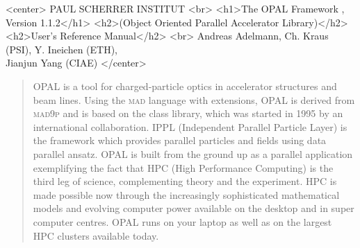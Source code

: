 \documentclass[12pt,a4paper]{report}
\newcommand{\opalversion}{\text{1.1.2 }}
\newcommand{\mad}{\textsc{mad }}
\newcommand{\madninep}{\textsc{mad9p }}
\newcommand{\opal}{\textsc{OPAL }}
\begin{document}
\begin{titlepage}

\begin{htmlonly}
\begin{rawhtml}
<center>
PAUL SCHERRER INSTITUT
<br>
<h1>The OPAL Framework , Version 1.1.2</h1>
<h2>(Object Oriented Parallel Accelerator Library)</h2>
<h2>User's Reference Manual</h2>
<br>
Andreas Adelmann, Ch. Kraus (PSI), Y. Ineichen (ETH), \\ Jianjun Yang (CIAE)
</center>
\end{rawhtml}
\end{htmlonly}

\begin{quotation}
\opal is a tool for charged-particle optics in
accelerator structures and beam lines. 
Using the \mad language with extensions, \opal is derived from \madninep and is based 
on the
 class library,
which was started in 1995 by an international collaboration.  IPPL (Independent Parallel Particle Layer) is
the framework which provides parallel particles and fields using data parallel ansatz. 
\opal is built from the ground up as a parallel application exemplifying the fact that HPC (High Performance Computing) 
is the third leg of science, complementing theory and the experiment. 
HPC is made possible now through the increasingly sophisticated mathematical models and evolving computer power available on the desktop
and in super computer centres. \opal runs on your laptop as well as on the largest HPC clusters available today.


\end{quotation}
\end{titlepage}
\end{document}
